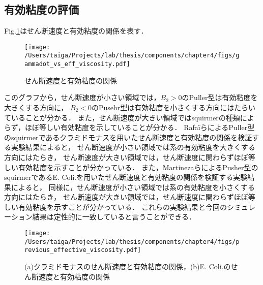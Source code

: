 \subsection{有効粘度の評価}
Fig.\ref{fig:estimate_eff_viscocity}はせん断速度と有効粘度の関係を表す．

    \begin{figure}[H]
        \centering
        \texttt{[image: /Users/taiga/Projects/lab/thesis/components/chapter4/figs/gammadot\_vs\_eff\_viscosity.pdf]}
        \caption{せん断速度と有効粘度の関係}
        \label{fig:estimate_eff_viscocity}
    \end{figure}

\noindent
このグラフから，せん断速度が小さい領域では，$B_2 > 0$のPuller型は有効粘度を大きくする方向に，
$B_2 < 0$のPusehr型は有効粘度を小さくする方向にはたらいていることが分かる．
また，せん断速度が大きい領域ではsquirmerの種類によらず，ほぼ等しい有効粘度を示していることが分かる．
Rafa\"iらによるPuller型のsquirmerであるクラミドモナスを用いたせん断速度と有効粘度の関係を検証する実験結果によると，
せん断速度が小さい領域では系の有効粘度を大きくする方向にはたらき，
せん断速度が大きい領域では，せん断速度に関わらずほぼ等しい有効粘度を示すことが分かっている\cite{effective_viscosity}．
また，MartinezaらによるPusher型のsquirmerであるE. Coli.を用いたせん断速度と有効粘度の関係を検証する実験結果によると，
同様に，せん断速度が小さい領域では系の有効粘度を小さくする方向にはたらき，
せん断速度が大きい領域では，せん断速度に関わらずほぼ等しい有効粘度を示すことが分かっている\cite{e_coli_experiment}．
これらの実験結果と今回のシミュレーション結果は定性的に一致していると言うことができる．

    \begin{figure}[htbp]
        \centering
        \texttt{[image: /Users/taiga/Projects/lab/thesis/components/chapter4/figs/previous\_effective\_viscosity.pdf]}
        \caption{(a)クラミドモナスのせん断速度と有効粘度の関係，(b)E. Coli.のせん断速度と有効粘度の関係}
    \end{figure}
